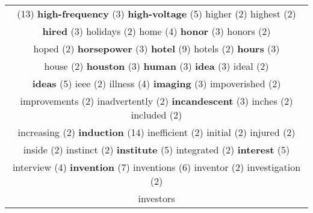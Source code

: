 \documentclass[12pt,a4paper]{article}
\begin{document}
\begin{center}
\begin{longtable}{|c|}
\footnotesize{(13)} {\small \textcolor{Laranja} {\bf high-frequency}} \footnotesize{(3)} {\large \textcolor{Roxo} {\bf high-voltage}} \footnotesize{(5)} {\footnotesize \textcolor{Verde} {higher}} \footnotesize{(2)} {\footnotesize \textcolor{Verde} {highest}} \footnotesize{(2)}  \\ {\small \textcolor{Laranja} {\bf hired}} \footnotesize{(3)} {\footnotesize \textcolor{Verde} {holidays}} \footnotesize{(2)} {\normalsize \textcolor{VerdeLocao} {home}} \footnotesize{(4)} {\small \textcolor{Laranja} {\bf honor}} \footnotesize{(3)} {\footnotesize \textcolor{Verde} {honors}} \footnotesize{(2)}  \\ {\footnotesize \textcolor{Verde} {hoped}} \footnotesize{(2)} {\small \textcolor{Laranja} {\bf horsepower}} \footnotesize{(3)} {\Huge \textcolor{AzulEscuro} {\bf hotel}} \footnotesize{(9)} {\footnotesize \textcolor{Verde} {hotels}} \footnotesize{(2)} {\small \textcolor{Laranja} {\bf hours}} \footnotesize{(3)}  \\ {\footnotesize \textcolor{Verde} {house}} \footnotesize{(2)} {\small \textcolor{Laranja} {\bf houston}} \footnotesize{(3)} {\small \textcolor{Laranja} {\bf human}} \footnotesize{(3)} {\small \textcolor{Laranja} {\bf idea}} \footnotesize{(3)} {\footnotesize \textcolor{Verde} {ideal}} \footnotesize{(2)}  \\ {\large \textcolor{Roxo} {\bf ideas}} \footnotesize{(5)} {\footnotesize \textcolor{Verde} {ieee}} \footnotesize{(2)} {\normalsize \textcolor{VerdeLocao} {illness}} \footnotesize{(4)} {\small \textcolor{Laranja} {\bf imaging}} \footnotesize{(3)} {\footnotesize \textcolor{Verde} {impoverished}} \footnotesize{(2)}  \\ {\footnotesize \textcolor{Verde} {improvements}} \footnotesize{(2)} {\footnotesize \textcolor{Verde} {inadvertently}} \footnotesize{(2)} {\small \textcolor{Laranja} {\bf incandescent}} \footnotesize{(3)} {\footnotesize \textcolor{Verde} {inches}} \footnotesize{(2)} {\footnotesize \textcolor{Verde} {included}} \footnotesize{(2)}  \\ {\footnotesize \textcolor{Verde} {increasing}} \footnotesize{(2)} {\Huge \textcolor{AzulEscuro} {\bf induction}} \footnotesize{(14)} {\footnotesize \textcolor{Verde} {inefficient}} \footnotesize{(2)} {\footnotesize \textcolor{Verde} {initial}} \footnotesize{(2)} {\footnotesize \textcolor{Verde} {injured}} \footnotesize{(2)}  \\ {\footnotesize \textcolor{Verde} {inside}} \footnotesize{(2)} {\footnotesize \textcolor{Verde} {instinct}} \footnotesize{(2)} {\large \textcolor{Roxo} {\bf institute}} \footnotesize{(5)} {\footnotesize \textcolor{Verde} {integrated}} \footnotesize{(2)} {\large \textcolor{Roxo} {\bf interest}} \footnotesize{(5)}  \\ {\normalsize \textcolor{VerdeLocao} {interview}} \footnotesize{(4)} {\LARGE \textcolor{Rosa} {\bf invention}} \footnotesize{(7)} {\Large \textcolor{VermEscuro} {inventions}} \footnotesize{(6)} {\footnotesize \textcolor{Verde} {inventor}} \footnotesize{(2)} {\footnotesize \textcolor{Verde} {investigation}} \footnotesize{(2)}  \\ {\footnotesize \textcolor{Verde} {investors}} 
\end{longtable}
\end{center}
\end{document}
